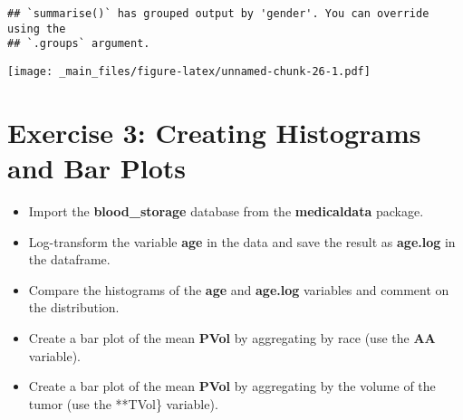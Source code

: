\documentclass[
]{book}
\providecommand{\tightlist}{%
  \setlength{\itemsep}{0pt}\setlength{\parskip}{0pt}}
\begin{document}
\begin{verbatim}
## `summarise()` has grouped output by 'gender'. You can override using the
## `.groups` argument.
\end{verbatim}

\texttt{[image: \_main\_files/figure-latex/unnamed-chunk-26-1.pdf]}

\section{Exercise 3: Creating Histograms and Bar Plots}\label{exercise-3-creating-histograms-and-bar-plots}

\begin{itemize}
\tightlist
\item
  Import the \textbf{blood\_storage} database from the \textbf{medicaldata} package.
\item
  Log-transform the variable \textbf{age} in the data and save the result as \textbf{age.log} in the dataframe.
\item
  Compare the histograms of the \textbf{age} and \textbf{age.log} variables and comment on the distribution.
\item
  Create a bar plot of the mean \textbf{PVol} by aggregating by race (use the \textbf{AA} variable).
\item
  Create a bar plot of the mean \textbf{PVol} by aggregating by the volume of the tumor (use the **TVol\} variable).
\end{itemize}

  
\end{document}
